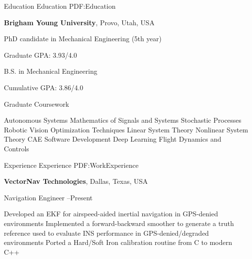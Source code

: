 \documentclass[letterpaper,MMMyyyy,nonstopmode]{simpleresumecv}
\begin{document}
\begin{Body}


\Section
{Education}
{Education}
{PDF:Education}

\Entry
{\textbf{Brigham Young University}},
Provo, Utah, USA

\Gap
\BulletItem
PhD candidate in Mechanical Engineering (5th year)
\hfill
\begin{Detail}
\SubBulletItem
Graduate GPA: 3.93/4.0
\end{Detail}

\BulletItem
B.S. in Mechanical Engineering
\hfill
\begin{Detail}
\SubBulletItem
Cumulative GPA: 3.86/4.0
\end{Detail}

\BulletItem
Graduate Coursework
\begin{multicols}{3}
\begin{flushleft}
\begin{Detail}
\SubBulletItem
Autonomous Systems
\SubBulletItem
Mathematics of Signals and Systems
\SubBulletItem
Stochastic Processes
\SubBulletItem
Robotic Vision
\SubBulletItem
Optimization Techniques
\SubBulletItem
Linear System Theory
\SubBulletItem
Nonlinear System Theory
\SubBulletItem
CAE Software Development
\SubBulletItem
Deep Learning
\SubBulletItem
Flight Dynamics and Controls
\end{Detail}
\end{flushleft}
\end{multicols}


\Section
{Experience}
{Experience}
{PDF:WorkExperience}

\Entry
\textbf{VectorNav Technologies},
Dallas, Texas, USA

\Gap
\BulletItem
Navigation Engineer
\hfill
{}--Present
\begin{Detail}
\SubBulletItem
Developed an EKF for airspeed-aided inertial navigation in GPS-denied environments
\SubBulletItem
Implemented a forward-backward smoother to generate a truth reference used to evaluate INS performance in GPS-denied/degraded environments
\SubBulletItem
Ported a Hard/Soft Iron calibration routine from C to modern C++


\end{Detail}
\end{Body}
\end{document}
